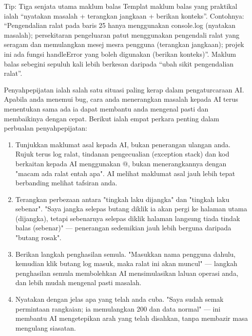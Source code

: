 \begin{tcbinfo}{Tip: Tiga senjata utama maklum balas}
Templat maklum balas yang praktikal ialah “nyatakan masalah + terangkan jangkaan + berikan konteks”. Contohnya: “Pengendalian ralat pada baris 25 hanya menggunakan console.log (nyatakan masalah); persekitaran pengeluaran patut menggunakan pengendali ralat yang seragam dan memulangkan mesej mesra pengguna (terangkan jangkaan); projek ini ada fungsi handleError yang boleh digunakan (berikan konteks)”. Maklum balas sebegini sepuluh kali lebih berkesan daripada “ubah sikit pengendalian ralat”.

\end{tcbinfo}


Penyahpepijatan ialah salah satu situasi paling kerap dalam pengaturcaraan AI. Apabila anda menemui bug, cara anda menerangkan masalah kepada AI terus menentukan sama ada ia dapat membantu anda mengenal pasti dan membaikinya dengan cepat. Berikut ialah empat perkara penting dalam perbualan penyahpepijatan:

\begin{enumerate}
  \item Tunjukkan maklumat asal kepada AI, bukan penerangan ulangan anda. Rujuk terus log ralat, tindanan pengecualian (exception stack) dan kod berkaitan kepada AI menggunakan @, bukan menerangkannya dengan "macam ada ralat entah apa". AI melihat maklumat asal jauh lebih tepat berbanding melihat tafsiran anda.
  \item Terangkan perbezaan antara "tingkah laku dijangka" dan "tingkah laku sebenar". "Saya jangka selepas butang diklik ia akan pergi ke halaman utama (dijangka), tetapi sebenarnya selepas diklik halaman langsung tiada tindak balas (sebenar)" — penerangan sedemikian jauh lebih berguna daripada "butang rosak".
  \item Berikan langkah penghasilan semula. "Masukkan nama pengguna dahulu, kemudian klik butang log masuk, maka ralat ini akan muncul" — langkah penghasilan semula membolehkan AI mensimulasikan laluan operasi anda, dan lebih mudah mengenal pasti masalah.
  \item Nyatakan dengan jelas apa yang telah anda cuba. "Saya sudah semak permintaan rangkaian; ia memulangkan 200 dan data normal" — ini membantu AI mengetepikan arah yang telah disahkan, tanpa membazir masa mengulang siasatan.
\end{enumerate}

